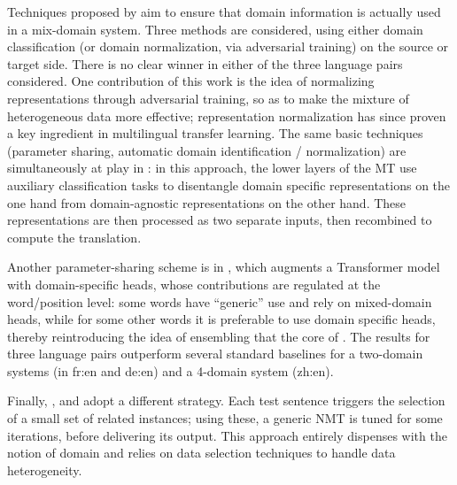 \documentclass[11pt,a4paper]{article}
\newcommand{\fyTodo}[1]{\Todo[FY:]{\textcolor{orange}{#1}}}
\begin{document}
Techniques proposed by \cite{Britz17mixing} aim to ensure that domain information is actually used in a mix-domain system. Three methods are considered, using either domain classification (or domain normalization, via adversarial training) on the source or target side. There is no clear winner in either of the three language pairs considered. One contribution of this work is the idea of normalizing representations through adversarial training, so as to make the mixture of heterogeneous data more effective; representation normalization has since proven a key ingredient in multilingual transfer learning.
The same basic techniques (parameter sharing, automatic domain identification / normalization) are simultaneously at play in \cite{Zeng18multidomain,Su19exploring}: in this approach, the lower layers of the MT use auxiliary classification tasks to disentangle domain specific representations on the one hand from domain-agnostic representations on the other hand. These representations are then processed as two separate inputs, then recombined to compute the translation.

Another parameter-sharing scheme is in \cite{Jiang19multidomain}, which augments a Transformer model with domain-specific heads, whose contributions are regulated at the word/position level: some words have ``generic'' use and rely on mixed-domain heads, while for some other words it is preferable to use domain specific heads, thereby reintroducing the idea of ensembling that the core of \cite{Huck15mixeddomain,Saunders19ucam}. The results for three language pairs outperform several standard baselines for a two-domain systems (in fr:en and de:en) and a 4-domain system (zh:en).%

Finally, \citet{Farajian17multidomain}, \citet{Li18onesentence} and \citet{Xu19lexical} adopt a different strategy. Each test sentence triggers the selection of a small set of related instances; using these, a generic NMT is tuned for some iterations, before delivering its output. This approach entirely dispenses with the notion of domain and relies on data selection techniques to handle data heterogeneity.
\end{document}
